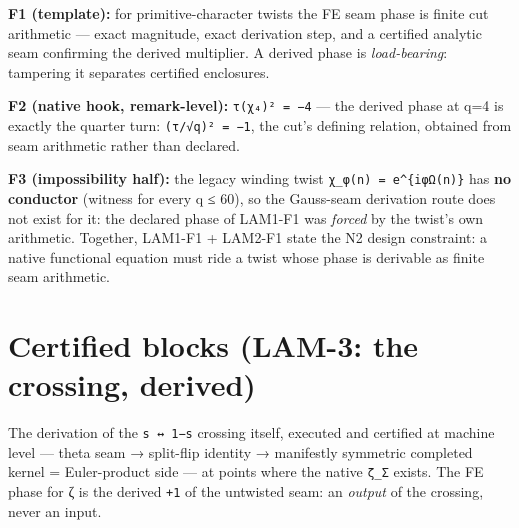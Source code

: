 \textbf{F1 (template):} for primitive-character twists the FE seam phase is
finite cut arithmetic --- exact magnitude, exact derivation step, and a
certified analytic seam confirming the derived multiplier. A derived
phase is \emph{load-bearing}: tampering it separates certified enclosures.

\textbf{F2 (native hook, remark-level):} \texttt{τ(χ₄)²\ =\ −4} --- the derived phase at
q=4 is exactly the quarter turn: \texttt{(τ/√q)²\ =\ −1}, the cut's defining
relation, obtained from seam arithmetic rather than declared.

\textbf{F3 (impossibility half):} the legacy winding twist
\texttt{χ\_φ(n)\ =\ e\^{}\{iφΩ(n)\}} has \textbf{no conductor} (witness for every q ≤ 60),
so the Gauss-seam derivation route does not exist for it: the declared
phase of LAM1-F1 was \emph{forced} by the twist's own arithmetic. Together,
LAM1-F1 + LAM2-F1 state the N2 design constraint: a native functional
equation must ride a twist whose phase is derivable as finite seam
arithmetic.

\hypertarget{certified-blocks-lam-3-the-crossing-derived}{%
\section{Certified blocks (LAM-3: the crossing, derived)}\label{certified-blocks-lam-3-the-crossing-derived}}

The derivation of the \texttt{s\ ↔\ 1−s} crossing itself, executed and certified
at machine level --- theta seam → split-flip identity → manifestly
symmetric completed kernel = Euler-product side --- at points where the
native \texttt{ζ\_Σ} exists. The FE phase for ζ is the derived \texttt{+1} of the
untwisted seam: an \emph{output} of the crossing, never an input.

